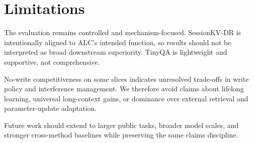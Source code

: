 \section{Limitations}
The evaluation remains controlled and mechanism-focused. SessionKV-DR is intentionally aligned to ALC's intended function, so results should not be interpreted as broad downstream superiority. TinyQA is lightweight and supportive, not comprehensive.

No-write competitiveness on some slices indicates unresolved trade-offs in write policy and interference management. We therefore avoid claims about lifelong learning, universal long-context gains, or dominance over external retrieval and parameter-update adaptation.

Future work should extend to larger public tasks, broader model scales, and stronger cross-method baselines while preserving the same claims discipline.

